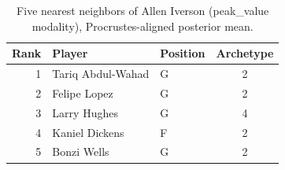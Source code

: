 \begin{table}[htbp]
  \centering\small
  \begin{tabular}{rllc}
    \toprule
    Rank & Player & Position & Archetype \\
    \midrule
    1 & Tariq Abdul-Wahad & G & 2 \\
    2 & Felipe Lopez & G & 2 \\
    3 & Larry Hughes & G & 4 \\
    4 & Kaniel Dickens & F & 2 \\
    5 & Bonzi Wells & G & 2 \\
    \bottomrule
  \end{tabular}
  \caption{Five nearest neighbors of Allen Iverson (peak_value modality), Procrustes-aligned posterior mean.}
  \label{tab:Allen_Iverson_neighbors_peak_value}
\end{table}

